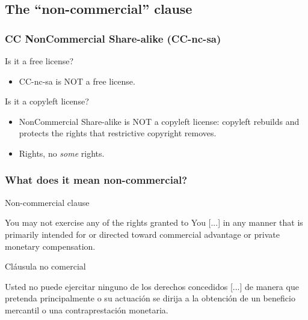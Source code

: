 \documentclass{beamer}
\begin{document}
\subsection{The ``non-commercial'' clause}

\begin{frame}
\frametitle{CC NonCommercial Share-alike (CC-nc-sa)}

Is it a free license?
\pause

\begin{itemize}
\item CC-nc-sa is \alert{NOT} a free license.
\end{itemize}                                                 

\pause

Is it a copyleft license?
\pause

\begin{itemize}
\item NonCommercial Share-alike is \alert{NOT} a copyleft license: copyleft rebuilds and protects the rights that restrictive copyright removes.
\item Rights, no \textit{some} rights.
\end{itemize}                                                 

\end{frame}

\begin{frame}
\frametitle{What does it mean non-commercial?}

\begin{block}{Non-commercial clause}
\small

You may not exercise any of the rights granted to You [...] in any manner that is primarily intended for or directed toward commercial advantage or private monetary compensation. 

\end{block}


\begin{block}{Cláusula no comercial}
\small

Usted no puede ejercitar ninguno de los derechos concedidos [...] de manera que pretenda principalmente o su actuación se dirija a la obtención de un beneficio mercantil o una contraprestación monetaria.

\end{block}


\end{frame}
\end{document}
